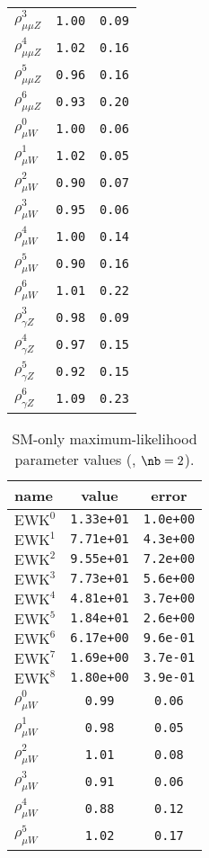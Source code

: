 \begin{table}
\begin{tabular}{lcc}
$\rho_{\mu\mu Z}^{3}$ & {\tt 1.00} & {\tt 0.09}\\
$\rho_{\mu\mu Z}^{4}$ & {\tt 1.02} & {\tt 0.16}\\
$\rho_{\mu\mu Z}^{5}$ & {\tt 0.96} & {\tt 0.16}\\
$\rho_{\mu\mu Z}^{6}$ & {\tt 0.93} & {\tt 0.20}\\
$\rho_{\mu W}^{0}$ & {\tt 1.00} & {\tt 0.06}\\
$\rho_{\mu W}^{1}$ & {\tt 1.02} & {\tt 0.05}\\
$\rho_{\mu W}^{2}$ & {\tt 0.90} & {\tt 0.07}\\
$\rho_{\mu W}^{3}$ & {\tt 0.95} & {\tt 0.06}\\
$\rho_{\mu W}^{4}$ & {\tt 1.00} & {\tt 0.14}\\
$\rho_{\mu W}^{5}$ & {\tt 0.90} & {\tt 0.16}\\
$\rho_{\mu W}^{6}$ & {\tt 1.01} & {\tt 0.22}\\
$\rho_{\gamma Z}^{3}$ & {\tt 0.98} & {\tt 0.09}\\
$\rho_{\gamma Z}^{4}$ & {\tt 0.97} & {\tt 0.15}\\
$\rho_{\gamma Z}^{5}$ & {\tt 0.92} & {\tt 0.15}\\
$\rho_{\gamma Z}^{6}$ & {\tt 1.09} & {\tt 0.23}\\
\hline
\end{tabular}
\end{table}

\begin{table}\centering
\caption{SM-only maximum-likelihood parameter values (\njethigh, $\nb = 2$).}
\label{tab:mlParameterValues2b_ge4j}
\begin{tabular}{lcc}name & value & error \\ \hline
$\mathrm{EWK}^{0}$ & {\tt  1.33e+01} & {\tt  1.0e+00}\\
$\mathrm{EWK}^{1}$ & {\tt  7.71e+01} & {\tt  4.3e+00}\\
$\mathrm{EWK}^{2}$ & {\tt  9.55e+01} & {\tt  7.2e+00}\\
$\mathrm{EWK}^{3}$ & {\tt  7.73e+01} & {\tt  5.6e+00}\\
$\mathrm{EWK}^{4}$ & {\tt  4.81e+01} & {\tt  3.7e+00}\\
$\mathrm{EWK}^{5}$ & {\tt  1.84e+01} & {\tt  2.6e+00}\\
$\mathrm{EWK}^{6}$ & {\tt  6.17e+00} & {\tt  9.6e-01}\\
$\mathrm{EWK}^{7}$ & {\tt  1.69e+00} & {\tt  3.7e-01}\\
$\mathrm{EWK}^{8}$ & {\tt  1.80e+00} & {\tt  3.9e-01}\\
$\rho_{\mu W}^{0}$ & {\tt 0.99} & {\tt 0.06}\\
$\rho_{\mu W}^{1}$ & {\tt 0.98} & {\tt 0.05}\\
$\rho_{\mu W}^{2}$ & {\tt 1.01} & {\tt 0.08}\\
$\rho_{\mu W}^{3}$ & {\tt 0.91} & {\tt 0.06}\\
$\rho_{\mu W}^{4}$ & {\tt 0.88} & {\tt 0.12}\\
$\rho_{\mu W}^{5}$ & {\tt 1.02} & {\tt 0.17}\\
\hline
\end{tabular}
\end{table}

